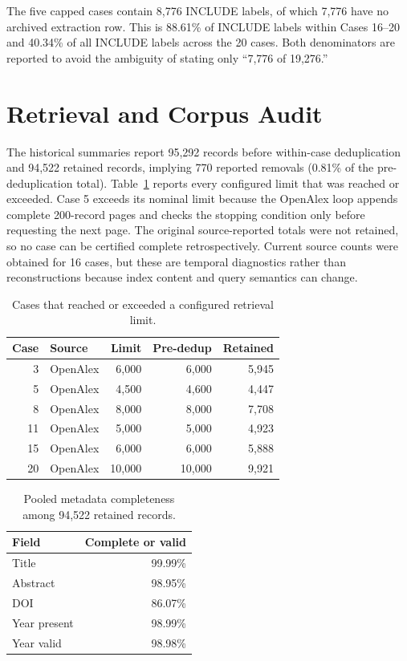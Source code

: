 \documentclass[acmsmall,anonymous,review]{acmart}
\begin{document}
The five capped cases contain 8,776 INCLUDE labels, of which 7,776 have no archived extraction row. This is 88.61\% of INCLUDE labels within Cases 16--20 and 40.34\% of all INCLUDE labels across the 20 cases. Both denominators are reported to avoid the ambiguity of stating only ``7,776 of 19,276.''

\section{Retrieval and Corpus Audit}

The historical summaries report 95,292 records before within-case deduplication and 94,522 retained records, implying 770 reported removals (0.81\% of the pre-deduplication total). Table~\ref{tab:limits} reports every configured limit that was reached or exceeded. Case 5 exceeds its nominal limit because the OpenAlex loop appends complete 200-record pages and checks the stopping condition only before requesting the next page. The original source-reported totals were not retained, so no case can be certified complete retrospectively. Current source counts were obtained for 16 cases, but these are temporal diagnostics rather than reconstructions because index content and query semantics can change.

\begin{table}[h]
\caption{Cases that reached or exceeded a configured retrieval limit.}
\label{tab:limits}
\begin{tabular}{rlrrr}
\toprule
\textbf{Case} & \textbf{Source} & \textbf{Limit} & \textbf{Pre-dedup} & \textbf{Retained} \\
\midrule
3 & OpenAlex & 6,000 & 6,000 & 5,945 \\
5 & OpenAlex & 4,500 & 4,600 & 4,447 \\
8 & OpenAlex & 8,000 & 8,000 & 7,708 \\
11 & OpenAlex & 5,000 & 5,000 & 4,923 \\
15 & OpenAlex & 6,000 & 6,000 & 5,888 \\
20 & OpenAlex & 10,000 & 10,000 & 9,921 \\
\bottomrule
\end{tabular}
\end{table}

\begin{table}[h]
\caption{Pooled metadata completeness among 94,522 retained records.}
\label{tab:metadata}
\begin{tabular}{lr}
\toprule
\textbf{Field} & \textbf{Complete or valid} \\
\midrule
Title & 99.99\% \\
Abstract & 98.95\% \\
DOI & 86.07\% \\
Year present & 98.99\% \\
Year valid & 98.98\% \\
\bottomrule
\end{tabular}
\end{table}
\end{document}
